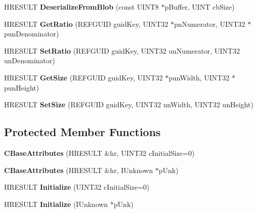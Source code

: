\begin{DoxyCompactItemize}
\item 
\mbox{\label{class_c_base_attributes_a5f86b4cf25990df277f51fb82b4b1228}} 
H\+R\+E\+S\+U\+LT {\bfseries Deserialize\+From\+Blob} (const U\+I\+N\+T8 $\ast$p\+Buffer, U\+I\+NT cb\+Size)
\item 
\mbox{\label{class_c_base_attributes_a08eb43102bb952d87683dc33828ca55c}} 
H\+R\+E\+S\+U\+LT {\bfseries Get\+Ratio} (R\+E\+F\+G\+U\+ID guid\+Key, U\+I\+N\+T32 $\ast$pn\+Numerator, U\+I\+N\+T32 $\ast$pun\+Denominator)
\item 
\mbox{\label{class_c_base_attributes_ab2b10bc02fe2596ec1631442d03139d9}} 
H\+R\+E\+S\+U\+LT {\bfseries Set\+Ratio} (R\+E\+F\+G\+U\+ID guid\+Key, U\+I\+N\+T32 un\+Numerator, U\+I\+N\+T32 un\+Denominator)
\item 
\mbox{\label{class_c_base_attributes_ad7527d90ef4d1ddb383ffa645e96f97b}} 
H\+R\+E\+S\+U\+LT {\bfseries Get\+Size} (R\+E\+F\+G\+U\+ID guid\+Key, U\+I\+N\+T32 $\ast$pun\+Width, U\+I\+N\+T32 $\ast$pun\+Height)
\item 
\mbox{\label{class_c_base_attributes_a90e44f72c90696c6b943508901f11885}} 
H\+R\+E\+S\+U\+LT {\bfseries Set\+Size} (R\+E\+F\+G\+U\+ID guid\+Key, U\+I\+N\+T32 un\+Width, U\+I\+N\+T32 un\+Height)
\end{DoxyCompactItemize}
\subsection*{Protected Member Functions}
\begin{DoxyCompactItemize}
\item 
\mbox{\label{class_c_base_attributes_ad16c0a38bc79a910e593e08e7f8f807f}} 
{\bfseries C\+Base\+Attributes} (H\+R\+E\+S\+U\+LT \&hr, U\+I\+N\+T32 c\+Initial\+Size=0)
\item 
\mbox{\label{class_c_base_attributes_a743f1c9277e3f5e73c5606aa5d39a996}} 
{\bfseries C\+Base\+Attributes} (H\+R\+E\+S\+U\+LT \&hr, I\+Unknown $\ast$p\+Unk)
\item 
\mbox{\label{class_c_base_attributes_ad60009855a74802a258b840a3fa16f81}} 
H\+R\+E\+S\+U\+LT {\bfseries Initialize} (U\+I\+N\+T32 c\+Initial\+Size=0)
\item 
\mbox{\label{class_c_base_attributes_a0f21b6dd4337e6ab36c3ee6c61e63b3b}} 
H\+R\+E\+S\+U\+LT {\bfseries Initialize} (I\+Unknown $\ast$p\+Unk)
\end{DoxyCompactItemize}
